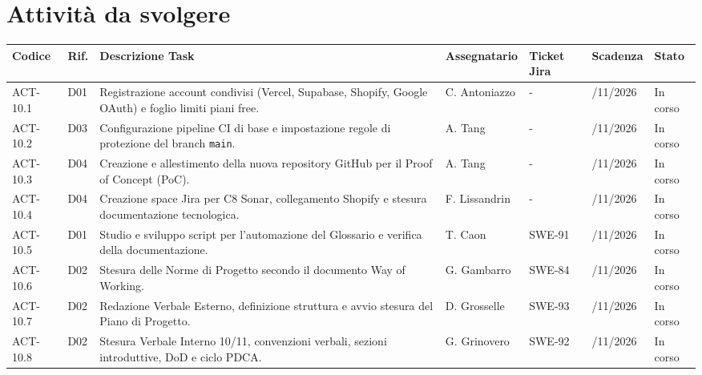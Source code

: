 \newpage

\section{Attività da svolgere}

\renewcommand{\arraystretch}{1.3}
\noindent
{\small\setlength{\tabcolsep}{3pt}%
\begin{tabularx}{\textwidth}{|>{\raggedright\arraybackslash}p{1.75cm}|>{\raggedright\arraybackslash}p{0.75cm}|>{\raggedright\arraybackslash}X|>{\raggedright\arraybackslash}p{2.3cm}|>{\raggedright\arraybackslash}p{1.35cm}|>{\raggedright\arraybackslash}p{1.8cm}|>{\raggedright\arraybackslash}p{1.85cm}|}
    \hline
    \textbf{Codice} & \textbf{Rif.} & \textbf{Descrizione Task} & \textbf{Assegnatario} & \textbf{Ticket Jira} & \textbf{Scadenza} & \textbf{Stato} \\
    \hline
    ACT-10.1 & D01 & Registrazione account condivisi (Vercel, Supabase, Shopify, Google OAuth) e foglio limiti piani free. & C. Antoniazzo & - & 17/11/2026 & In corso \\
    \hline
    ACT-10.2 & D03 & Configurazione pipeline CI di base e impostazione regole di protezione del branch \texttt{main}. & A. Tang & - & 17/11/2026 & In corso \\
    \hline
    ACT-10.3 & D04 & Creazione e allestimento della nuova repository GitHub per il Proof of Concept (PoC). & A. Tang & - & 17/11/2026 & In corso \\
    \hline
    ACT-10.4 & D04 & Creazione space Jira per C8 Sonar, collegamento Shopify e stesura documentazione tecnologica. & F. Lissandrin & - & 17/11/2026 & In corso \\
    \hline
    ACT-10.5 & D01 & Studio e sviluppo script per l'automazione del Glossario e verifica della documentazione. & T. Caon & SWE-91 & 17/11/2026 & In corso \\
    \hline
    ACT-10.6 & D02 & Stesura delle Norme di Progetto secondo il documento Way of Working. & G. Gambarro & SWE-84 & 17/11/2026 & In corso \\
    \hline
    ACT-10.7 & D02 & Redazione Verbale Esterno, definizione struttura e avvio stesura del Piano di Progetto. & D. Grosselle & SWE-93 & 17/11/2026 & In corso \\
    \hline
    ACT-10.8 & D02 & Stesura Verbale Interno 10/11, convenzioni verbali, sezioni introduttive, DoD e ciclo PDCA. & G. Grinovero & SWE-92 & 17/11/2026 & In corso \\
    \hline
\end{tabularx}}
